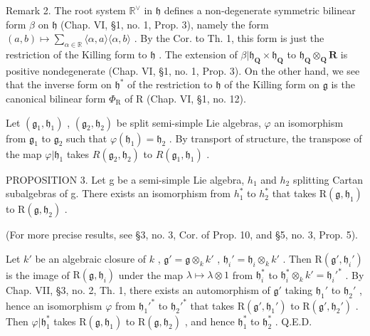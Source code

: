Remark 2. The root system \(\mathbb{R}^{\vee}\) in \(\mathfrak{h}\) defines a non-degenerate symmetric bilinear form \(\beta\) on \(\mathfrak{h}\) (Chap. VI, §1, no. 1, Prop. 3), namely the form \((a,b)\mapsto \sum_{\alpha \in \mathbb{R}}\langle \alpha ,a\rangle \langle \alpha ,b\rangle\) . By the Cor. to Th. 1, this form is just the restriction of the Killing form to \(\mathfrak{h}\) . The extension of \(\beta |\mathfrak{h}_{\mathbf{Q}}\times \mathfrak{h}_{\mathbf{Q}}\) to \(\mathfrak{h}_{\mathbf{Q}}\otimes_{\mathbf{Q}}\mathbf{R}\) is positive nondegenerate (Chap. VI, §1, no. 1, Prop. 3). On the other hand, we see that the inverse form on \(\mathfrak{h}^*\) of the restriction to \(\mathfrak{h}\) of the Killing form on \(\mathfrak{g}\) is the canonical bilinear form \(\Phi_{\mathrm{R}}\) of R (Chap. VI, §1, no. 12).

Let \((\mathfrak{g}_{1},\mathfrak{h}_{1})\) , \((\mathfrak{g}_{2},\mathfrak{h}_{2})\) be split semi-simple Lie algebras, \(\varphi\) an isomorphism from \(\mathfrak{g}_{1}\) to \(\mathfrak{g}_{2}\) such that \(\varphi(\mathfrak{h}_{1})=\mathfrak{h}_{2}\) . By transport of structure, the transpose of the map \(\varphi|\mathfrak{h}_{1}\) takes \(R(\mathfrak{g}_{2},\mathfrak{h}_{2})\) to \(R(\mathfrak{g}_{1},\mathfrak{h}_{1})\) .

PROPOSITION 3. Let g be a semi-simple Lie algebra, \(h_{1}\) and \(h_{2}\) splitting Cartan subalgebras of g. There exists an isomorphism from \(h_{1}^{*}\) to \(h_{2}^{*}\) that takes \(\mathrm{R}(\mathfrak{g},\mathfrak{h}_{1})\) to \(\mathrm{R}(\mathfrak{g},\mathfrak{h}_{2})\) .

(For more precise results, see §3, no. 3, Cor. of Prop. 10, and §5, no. 3, Prop. 5).

Let \(k'\) be an algebraic closure of \(k\) , \(\mathfrak{g}' = \mathfrak{g} \otimes_k k'\) , \(\mathfrak{h}_i' = \mathfrak{h}_i \otimes_k k'\) . Then \(\mathrm{R}(\mathfrak{g}', \mathfrak{h}_i')\) is the image of \(\mathrm{R}(\mathfrak{g}, \mathfrak{h}_i)\) under the map \(\lambda \mapsto \lambda \otimes 1\) from \(\mathfrak{h}_i^*\) to \(\mathfrak{h}_i^* \otimes_k k' = \mathfrak{h}_i'^*\) . By Chap. VII, §3, no. 2, Th. 1, there exists an automorphism of \(\mathfrak{g}'\) taking \(\mathfrak{h}_1'\) to \(\mathfrak{h}_2'\) , hence an isomorphism \(\varphi\) from \(\mathfrak{h}_1'^*\) to \(\mathfrak{h}_2'^*\) that takes \(\mathrm{R}(\mathfrak{g}', \mathfrak{h}_1')\) to \(\mathrm{R}(\mathfrak{g}', \mathfrak{h}_2')\) . Then \(\varphi | \mathfrak{h}_1^*\) takes \(\mathrm{R}(\mathfrak{g}, \mathfrak{h}_1)\) to \(\mathrm{R}(\mathfrak{g}, \mathfrak{h}_2)\) , and hence \(\mathfrak{h}_1^*\) to \(\mathfrak{h}_2^*\) . Q.E.D.

